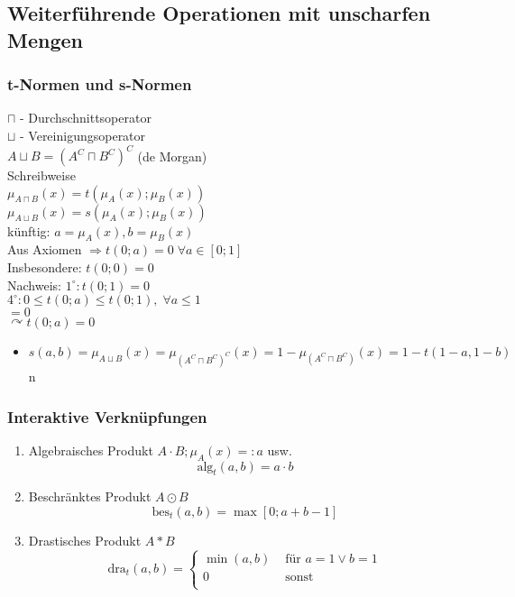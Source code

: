 \documentclass[a4paper]{scrartcl}
\begin{document}
\subsection{Weiterführende Operationen mit unscharfen Mengen}
\subsubsection{t-Normen und s-Normen}
$\sqcap$ - Durchschnittsoperator\\
$\sqcup$ - Vereinigungsoperator\\
$A \sqcup B = (A^C \sqcap B^C )^C$ (de Morgan)\\
Schreibweise\\
$\mu_{A \sqcap B} (x) = t (\mu_A (x); \mu_B (x) )$\\
$\mu_{A \sqcup B} (x) = s (\mu_A (x); \mu_B (x) )$\\
künftig: $a= \mu_A (x), b= \mu_B (x)$\\
Aus Axiomen $\Rightarrow t(0;a) = 0 \; \forall a \in [0;1]$\\
Insbesondere: $t(0;0) = 0$\\

Nachweis: $1^\circ : t (0;1) = 0$\\
$4^\circ : 0 \leq t (0;a) \leq t(0;1), \; \forall a \leq 1$ \\
$= 0$\\
$\curvearrowright t(0;a) = 0$
\begin{itemize}
\item $s(a,b) = \mu_{A \sqcup B} (x) = \mu_{(A^C \sqcap B^C)^C }(x) = 1 - \mu_{(A^C \sqcap B^C)} (x) = 1 - t(1-a,1-b)$n
\end{itemize}


\subsubsection{Interaktive Verknüpfungen}
\begin{enumerate}
\item Algebraisches Produkt $A \cdot B; \mu_A(x) =: a$ usw.
\[ \text{alg}_t (a,b) = a \cdot b \]
\item Beschränktes Produkt $A \odot B$
\[ \text{bes}_t (a,b) = \max [ 0;a+b-1] \]
\item Drastisches Produkt $A \ast B$
\[ \text{dra}_t (a,b) = \left\{ \begin{array}{cr} \min (a,b) & \text{ für } a=1 \vee b=1 \\ 0 & \text{ sonst} \\ \end{array} \right.\]
\end{enumerate}
\end{document}
